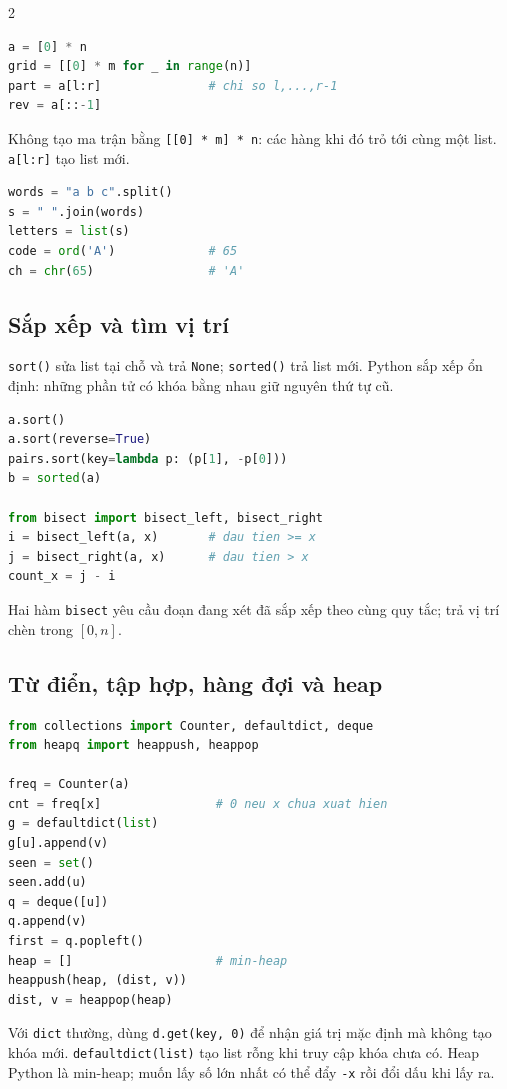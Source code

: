 \begin{multicols}{2}
\begin{lstlisting}[language=Python]
a = [0] * n
grid = [[0] * m for _ in range(n)]
part = a[l:r]               # chi so l,...,r-1
rev = a[::-1]
\end{lstlisting}
Không tạo ma trận bằng \texttt{[[0] * m] * n}: các hàng khi đó
trỏ tới cùng một list. \texttt{a[l:r]} tạo list mới.
\begin{lstlisting}[language=Python]
words = "a b c".split()
s = " ".join(words)
letters = list(s)
code = ord('A')             # 65
ch = chr(65)                # 'A'
\end{lstlisting}

\subsection{Sắp xếp và tìm vị trí}
\texttt{sort()} sửa list tại chỗ và trả \texttt{None};
\texttt{sorted()} trả list mới. Python sắp xếp ổn định:
những phần tử có khóa bằng nhau giữ nguyên thứ tự cũ.
\begin{lstlisting}[language=Python]
a.sort()
a.sort(reverse=True)
pairs.sort(key=lambda p: (p[1], -p[0]))
b = sorted(a)

from bisect import bisect_left, bisect_right
i = bisect_left(a, x)       # dau tien >= x
j = bisect_right(a, x)      # dau tien > x
count_x = j - i
\end{lstlisting}
Hai hàm \texttt{bisect} yêu cầu đoạn đang xét đã sắp xếp theo
cùng quy tắc; trả vị trí chèn trong $[0,n]$.

\subsection{Từ điển, tập hợp, hàng đợi và heap}
\begin{lstlisting}[language=Python]
from collections import Counter, defaultdict, deque
from heapq import heappush, heappop

freq = Counter(a)
cnt = freq[x]                # 0 neu x chua xuat hien
g = defaultdict(list)
g[u].append(v)
seen = set()
seen.add(u)
q = deque([u])
q.append(v)
first = q.popleft()
heap = []                    # min-heap
heappush(heap, (dist, v))
dist, v = heappop(heap)
\end{lstlisting}
Với \texttt{dict} thường, dùng \texttt{d.get(key, 0)} để nhận
giá trị mặc định mà không tạo khóa mới. \texttt{defaultdict(list)}
tạo list rỗng khi truy cập khóa chưa có. Heap Python là min-heap;
muốn lấy số lớn nhất có thể đẩy \texttt{-x} rồi đổi dấu khi lấy ra.


\end{multicols}
